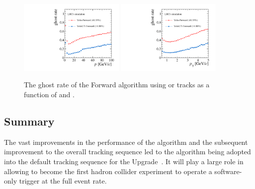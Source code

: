 \begin{figure}[!tb]
\centering
\includegraphics[width=0.45\textwidth]{figs/upstream-tracking-upgrade/fwd_gr_p_comp.pdf}
\includegraphics[width=0.45\textwidth]{figs/upstream-tracking-upgrade/fwd_gr_pt_comp.pdf}
\caption{The ghost rate of the Forward algorithm using \velo or \velout tracks as a function of \ptot and \pt.}
\label{fig:gr_fwd_comp}
\end{figure}

\subsection{Summary}

The vast improvements in the performance of the \velout algorithm and the subsequent improvement to the overall tracking sequence led to the algorithm being adopted into the default tracking sequence for the \lhcb Upgrade~\cite{upgrade-tracker-tdr,upgrade-trigger-tdr}. It will play a large role in allowing \lhcb to become the first hadron collider experiment to operate a software-only trigger at the full event rate.

